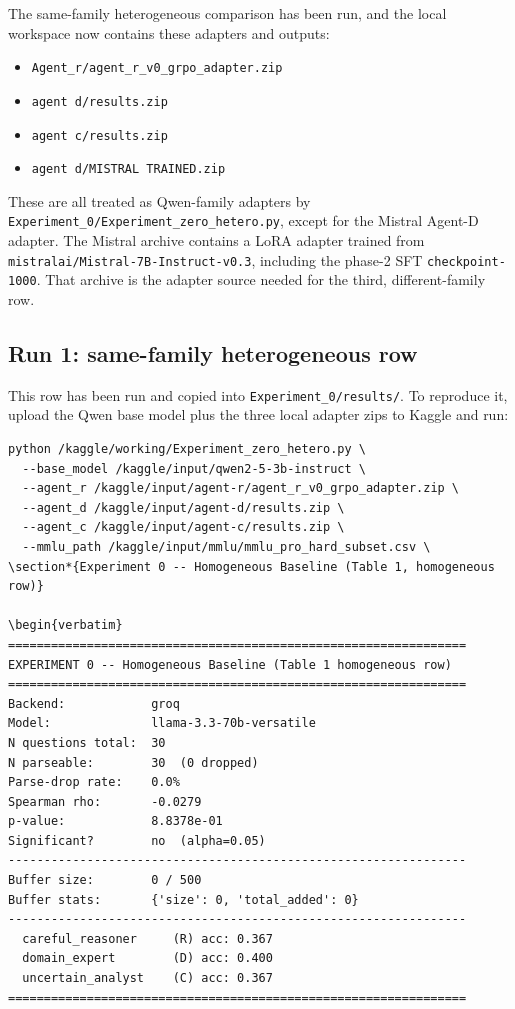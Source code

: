 \documentclass{article}
\begin{document}
The same-family heterogeneous comparison has been run, and the local
workspace now contains these adapters and outputs:

\begin{itemize}
\item \texttt{Agent\_r/agent\_r\_v0\_grpo\_adapter.zip}
\item \texttt{agent d/results.zip}
\item \texttt{agent c/results.zip}
\item \texttt{agent d/MISTRAL TRAINED.zip}
\end{itemize}

These are all treated as Qwen-family adapters by
\texttt{Experiment\_0/Experiment\_zero\_hetero.py}, except for the Mistral
Agent-D adapter. The Mistral archive contains a LoRA adapter trained from
\texttt{mistralai/Mistral-7B-Instruct-v0.3}, including the phase-2 SFT
\texttt{checkpoint-1000}. That archive is the adapter source needed for the
third, different-family row.

\subsection{Run 1: same-family heterogeneous row}

This row has been run and copied into \texttt{Experiment\_0/results/}. To
reproduce it, upload the Qwen base model plus the three local adapter zips to
Kaggle and run:

\begin{verbatim}
python /kaggle/working/Experiment_zero_hetero.py \
  --base_model /kaggle/input/qwen2-5-3b-instruct \
  --agent_r /kaggle/input/agent-r/agent_r_v0_grpo_adapter.zip \
  --agent_d /kaggle/input/agent-d/results.zip \
  --agent_c /kaggle/input/agent-c/results.zip \
  --mmlu_path /kaggle/input/mmlu/mmlu_pro_hard_subset.csv \
\section*{Experiment 0 -- Homogeneous Baseline (Table 1, homogeneous row)}

\begin{verbatim}
================================================================
EXPERIMENT 0 -- Homogeneous Baseline (Table 1 homogeneous row)
================================================================
Backend:            groq
Model:              llama-3.3-70b-versatile
N questions total:  30
N parseable:        30  (0 dropped)
Parse-drop rate:    0.0%
Spearman rho:       -0.0279
p-value:            8.8378e-01
Significant?        no  (alpha=0.05)
----------------------------------------------------------------
Buffer size:        0 / 500
Buffer stats:       {'size': 0, 'total_added': 0}
----------------------------------------------------------------
  careful_reasoner     (R) acc: 0.367
  domain_expert        (D) acc: 0.400
  uncertain_analyst    (C) acc: 0.367
================================================================
\end{verbatim}
\end{document}
